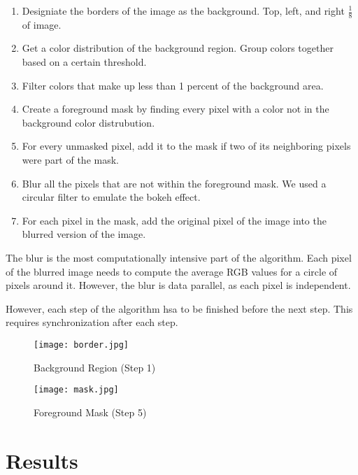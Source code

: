 \documentclass[12pt]{article}
\begin{document}
\begin{enumerate}
    \item
        Designiate the borders of the image as the background. Top, left, and
        right $\tfrac{1}{8}$ of image.
    \item
        Get a color distribution of the background region. Group colors together
        based on a certain threshold.
    \item
        Filter colors that make up less than 1 percent of the background area.
    \item
        Create a foreground mask by finding every pixel with a color not
        in the background color distrubution.
    \item
        For every unmasked pixel, add it to the mask if two of its neighboring
        pixels were part of the mask.
    \item
        Blur all the pixels that are not within the foreground mask. We used a
        circular filter to emulate the bokeh effect.
    \item
        For each pixel in the mask, add the original pixel of the image into
        the blurred version of the image.
\end{enumerate}

The blur is the most computationally intensive part of the algorithm. Each pixel
of the blurred image needs to compute the average RGB values for a circle
of pixels around it. However, the blur is data parallel, as each pixel is
independent.

However, each step of the algorithm hsa to be finished before the next step.
This requires synchronization after each step.

\begin{figure}[!htb]
    \begin{minipage}{0.48\textwidth}
        \centering
        \texttt{[image: border.jpg]}
        \caption{Background Region (Step 1)}
    \end{minipage}\hfill
    \begin{minipage}{0.48\textwidth}
        \centering
        \texttt{[image: mask.jpg]}
        \caption{Foreground Mask (Step 5)}
    \end{minipage}\hfill
\end{figure}

\section{Results}
\end{document}
